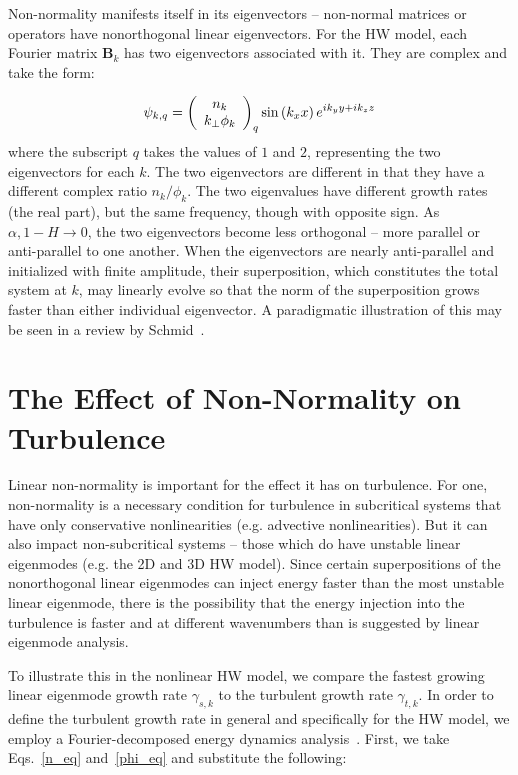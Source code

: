 \documentclass[twocolumn,showkeys,superscriptaddress]{revtex4}
\def\beq{\begin{equation}}
\def\eeq{\end{equation}}
\begin{document}
Non-normality manifests itself in its eigenvectors -- non-normal matrices or operators have nonorthogonal linear eigenvectors. For the HW model, each Fourier matrix $\mathbf{B}_k$ has two eigenvectors associated
with it. They are complex and take the form:

\beq
\label{lin_eigen_form}
\psi_{k,q} = \left( \begin{array}{cc} n_k \\ k_\perp \phi_k \end{array} \right)_q {\rm sin} \left( k_x x \right) e^{i k_y y + i k_z z} 
\eeq
where the subscript $q$ takes the values of $1$ and $2$, representing the two eigenvectors for each $k$. The two eigenvectors are different in that they have a different complex ratio $n_k/\phi_k$.
The two eigenvalues have different growth rates (the real part), but the same frequency, though with opposite sign.
As $\alpha, 1-H \to 0$, the two eigenvectors become less orthogonal -- more parallel or anti-parallel to one another. When the eigenvectors are nearly anti-parallel and initialized with finite amplitude,
their superposition, which constitutes the total system at $k$, may linearly evolve so that the norm of the superposition grows faster than either individual eigenvector. A paradigmatic illustration
of this may be seen in a review by Schmid~\cite{schmid2007}.

\section{The Effect of Non-Normality on Turbulence}
\label{sec_non_norm_turb}

Linear non-normality is important for the effect it has on turbulence. For one, non-normality is a necessary condition for turbulence in subcritical systems that have only conservative nonlinearities 
(e.g. advective nonlinearities). But it can also impact non-subcritical systems -- those which do have unstable linear eigenmodes (e.g. the 2D and 3D HW model). 
Since certain superpositions of the nonorthogonal linear eigenmodes can inject energy faster than the most unstable linear
eigenmode, there is the possibility that the energy injection into the turbulence is faster and at different wavenumbers than is suggested by linear eigenmode analysis. 

To illustrate this in the nonlinear HW model, we compare the fastest growing linear eigenmode growth rate $\gamma_{s,k}$ to the turbulent growth rate $\gamma_{t,k}$. 
In order to define the turbulent growth rate in general and specifically for the HW model, we employ a Fourier-decomposed energy dynamics analysis~\cite{camargo1995,friedman2012b,friedman2013}. 
First, we take Eqs.~\ref{n_eq} and~\ref{phi_eq} and substitute the following:
\end{document}
